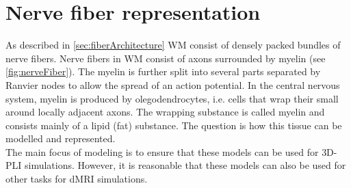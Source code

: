 \section{Nerve fiber representation}
\label{sec:nerve_fiber_representation}
% 
As described in \cref{sec:fiberArchitecture} \ac{WM} consist of densely packed bundles of nerve fibers.
Nerve fibers in \ac{WM} consist of axons surrounded by myelin (see \cref{fig:nerveFiber}).
The myelin is further split into several parts separated by Ranvier nodes to allow the spread of an action potential.
In the central nervous system, myelin is produced by olegodendrocytes, i.e. cells that wrap their small  around locally adjacent axons.
The wrapping substance is called myelin and consists mainly of a lipid (fat) substance.
The question is how this tissue can be modelled and represented.
\\
% 
The main focus of modeling is to ensure that these models can be used for \ac{3D-PLI} simulations.
However, it is reasonable that these models can also be used for other tasks \eg{} for \ac{dMRI} simulations.
% 
